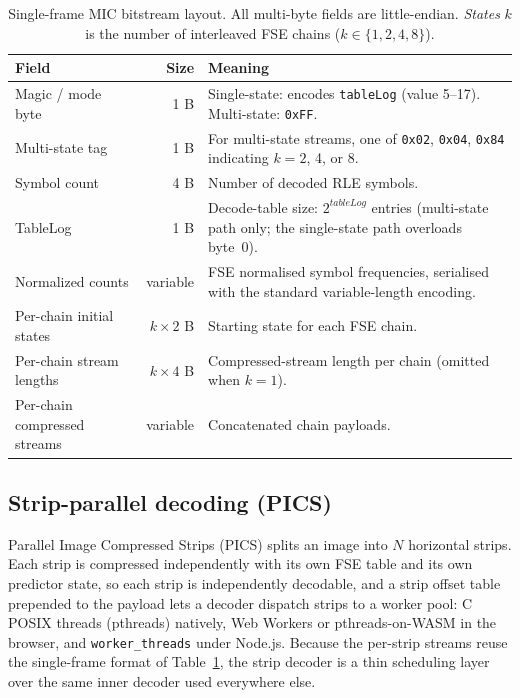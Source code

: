 \documentclass[journal]{IEEEtran}
\begin{document}
\begin{table}[htbp]
\centering
\caption{Single-frame MIC bitstream layout. All multi-byte fields are
little-endian. \emph{States} $k$ is the number of interleaved FSE chains
($k \in \{1,2,4,8\}$).}
\label{tab:format}
\scriptsize
\begin{tabular}{p{2.4cm}rp{4.4cm}}
\toprule
Field & Size & Meaning \\
\midrule
Magic / mode byte & 1 B & Single-state: encodes \texttt{tableLog} (value 5--17). Multi-state: \texttt{0xFF}. \\
Multi-state tag & 1 B & For multi-state streams, one of \texttt{0x02}, \texttt{0x04}, \texttt{0x84} indicating $k=2$, 4, or 8. \\
Symbol count & 4 B & Number of decoded RLE symbols. \\
TableLog & 1 B & Decode-table size: $2^{\textit{tableLog}}$ entries (multi-state path only; the single-state path overloads byte~0). \\
Normalized counts & variable & FSE normalised symbol frequencies, serialised with the standard variable-length encoding. \\
Per-chain initial states & $k \times 2$ B & Starting state for each FSE chain. \\
Per-chain stream lengths & $k \times 4$ B & Compressed-stream length per chain (omitted when $k=1$). \\
Per-chain compressed streams & variable & Concatenated chain payloads. \\
\bottomrule
\end{tabular}
\end{table}

\subsection{Strip-parallel decoding (PICS)}
\label{sec:pics}

Parallel Image Compressed Strips (PICS) splits an image into $N$ horizontal
strips. Each strip is compressed independently with its own FSE table and its
own predictor state, so each strip is independently decodable, and a strip
offset table prepended to the payload lets a decoder dispatch strips to a
worker pool: C POSIX threads (pthreads) natively, Web Workers or
pthreads-on-WASM in the browser, and \texttt{worker\_threads} under Node.js.
Because the per-strip streams reuse the single-frame format of
Table~\ref{tab:format}, the strip decoder is a thin scheduling layer over the
same inner decoder used everywhere else.
\end{document}

